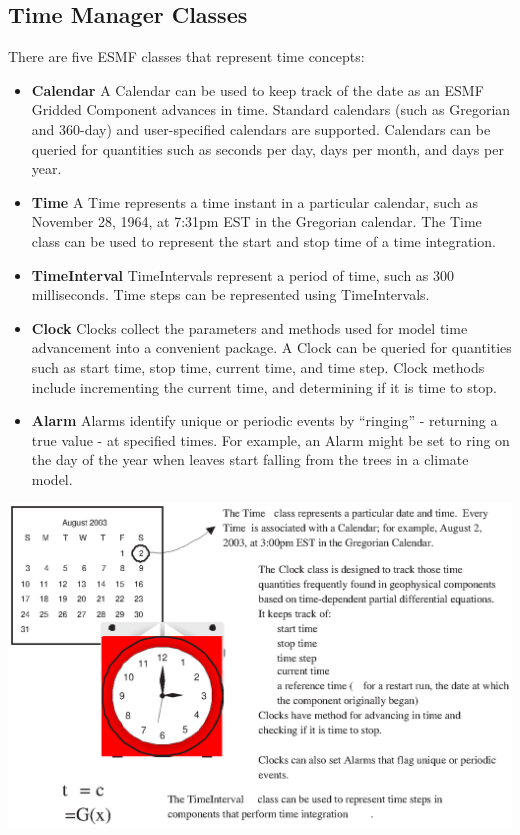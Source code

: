 \subsection{Time Manager Classes}
There are five ESMF classes that represent time concepts:
\begin{itemize}
\item {\bf Calendar}  A Calendar can be used to keep track of the 
date as an ESMF Gridded Component advances in time. Standard calendars 
(such as Gregorian and 360-day) and user-specified calendars are 
supported.  Calendars can be queried for quantities such as seconds 
per day, days per month, and days per year.  
\item {\bf Time} A Time represents a time instant in a particular
calendar, such as November 28, 1964, at 7:31pm EST in the Gregorian 
calendar.  The Time class can be used 
to represent the start and stop time of a time integration.
\item {\bf TimeInterval} TimeIntervals represent a period 
of time, such as 300 milliseconds.  Time steps can be represented 
using TimeIntervals.  
\item {\bf Clock} Clocks collect the parameters and 
methods used for model time advancement into a convenient 
package.  A Clock can be queried for quantities such
as start time, stop time, current time, and time step.  Clock
methods include incrementing the current time, and determining
if it is time to stop.  
\item {\bf Alarm} Alarms identify unique or periodic events
by ``ringing'' - returning a true value - at specified times.  
For example, an Alarm might be set to ring on the day of the 
year when leaves start falling from the trees in a climate model.
\end{itemize}

\begin{center}
\includegraphics{TimeMgr_desc}
\end{center}

